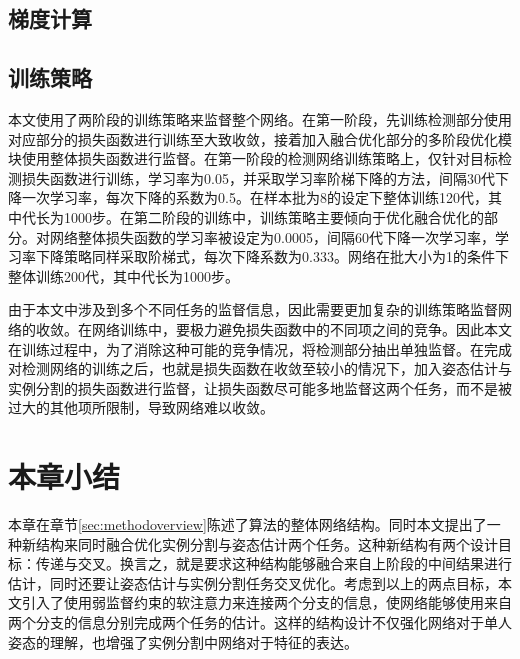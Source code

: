 \subsection{梯度计算}
\label{subsec:gradient}

\subsection{训练策略}
\label{subsec:trainingstrategy}

本文使用了两阶段的训练策略来监督整个网络。在第一阶段，先训练检测部分使用对应部分的损失函数进行训练至大致收敛，接着加入融合优化部分的多阶段优化模块使用整体损失函数进行监督。在第一阶段的检测网络训练策略上，仅针对目标检测损失函数进行训练，学习率为0.05，并采取学习率阶梯下降的方法，间隔30代下降一次学习率，每次下降的系数为0.5。在样本批为8的设定下整体训练120代，其中代长为1000步。在第二阶段的训练中，训练策略主要倾向于优化融合优化的部分。对网络整体损失函数的学习率被设定为0.0005，间隔60代下降一次学习率，学习率下降策略同样采取阶梯式，每次下降系数为0.333。网络在批大小为1的条件下整体训练200代，其中代长为1000步。

由于本文中涉及到多个不同任务的监督信息，因此需要更加复杂的训练策略监督网络的收敛。在网络训练中，要极力避免损失函数中的不同项之间的竞争。因此本文在训练过程中，为了消除这种可能的竞争情况，将检测部分抽出单独监督。在完成对检测网络的训练之后，也就是损失函数在收敛至较小的情况下，加入姿态估计与实例分割的损失函数进行监督，让损失函数尽可能多地监督这两个任务，而不是被过大的其他项所限制，导致网络难以收敛。

\section{本章小结}
本章在章节\ref{sec:methodoverview}陈述了算法的整体网络结构。同时本文提出了一种新结构来同时融合优化实例分割与姿态估计两个任务。这种新结构有两个设计目标：传递与交叉。换言之，就是要求这种结构能够融合来自上阶段的中间结果进行估计，同时还要让姿态估计与实例分割任务交叉优化。考虑到以上的两点目标，本文引入了使用弱监督约束的软注意力来连接两个分支的信息，使网络能够使用来自两个分支的信息分别完成两个任务的估计。这样的结构设计不仅强化网络对于单人姿态的理解，也增强了实例分割中网络对于特征的表达。